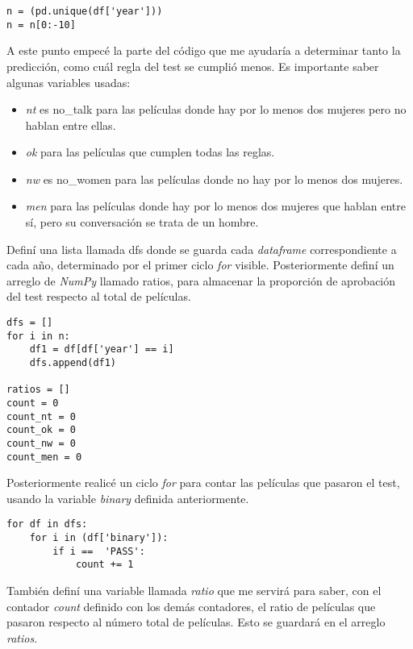 \documentclass{article}
\begin{document}
\begin{lstlisting}
n = (pd.unique(df['year']))
n = n[0:-10]
\end{lstlisting}

A este punto empecé la parte del código que me ayudaría a determinar tanto la predicción, como cuál regla del test se cumplió menos. Es importante saber algunas variables usadas:

\begin{itemize}
    \item \textit{nt} es no\_talk para las películas donde hay por lo menos dos mujeres pero no hablan entre ellas.
    \item \textit{ok} para las películas que cumplen todas las reglas.
    \item \textit{nw} es no\_women para las películas donde no hay por lo menos dos mujeres.
    \item \textit{men} para las películas donde hay por lo menos dos mujeres que hablan entre sí, pero su conversación se trata de un hombre.
\end{itemize}

Definí una lista llamada dfs donde se guarda cada \textit{dataframe} correspondiente a cada año, determinado por el primer ciclo \textit{for} visible. Posteriormente definí un arreglo de \textit{NumPy} llamado ratios, para almacenar la proporción de aprobación del test respecto al total de películas.

\begin{lstlisting}
dfs = []
for i in n:
    df1 = df[df['year'] == i]
    dfs.append(df1)

ratios = []
count = 0
count_nt = 0
count_ok = 0
count_nw = 0
count_men = 0

\end{lstlisting}

Posteriormente realicé un ciclo \textit{for} para contar las películas que pasaron el test, usando la variable \textit{binary} definida anteriormente. 

\begin{lstlisting}
for df in dfs:
    for i in (df['binary']):
        if i ==  'PASS':
            count += 1
\end{lstlisting}

También definí una variable llamada \textit{ratio} que me servirá para saber, con el contador \textit{count} definido con los demás contadores, el ratio de películas que pasaron respecto al número total de películas. Esto se guardará en el arreglo \textit{ratios}.
\end{document}

